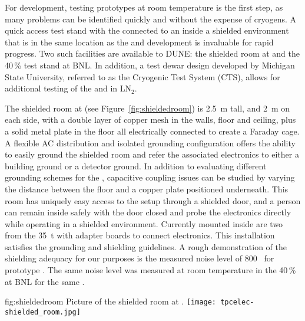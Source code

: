 For  development, testing prototypes at room temperature is the first step, as many problems can be identified quickly and without the expense of cryogens.  A quick access test stand with the  connected to an  inside a shielded environment that is in the same location as the  and  development is invaluable for rapid progress.  Two such facilities are available to DUNE: the shielded room at \fnal and the \num{40}\,\%  test stand at BNL.  In addition, a test dewar design developed by Michigan State University, referred to as the Cryogenic Test System (CTS), allows for additional testing of the  and  in LN$_2$.

The shielded room at \fnal (see Figure~\ref{fig:shieldedroom}) is \SI{2.5}{m} tall, and \SI{2}{m} on each side, with 
a double layer of copper mesh in the walls, floor and ceiling, plus a solid metal plate in the floor all electrically connected to create a Faraday cage.  A flexible AC distribution and isolated grounding configuration offers the ability to easily ground the shielded room and refer the associated electronics to either a building ground or a detector ground.  In addition
to evaluating different grounding schemes for the , capacitive coupling issues can be studied by varying the
distance between the floor and a copper plate positioned underneath.   
This room has uniquely easy access to the setup through a shielded door,
and a person can remain inside safely with the door closed and probe the electronics directly while operating
in a shielded environment.  Currently mounted inside are two  from the \SI{35}{t} 
with adapter boards to connect  electronics.  This installation satisfies the  grounding and shielding guidelines.  A rough demonstration of the shielding adequacy for our purposes  is the measured noise level of 800~ for  prototype .  The same noise level was measured at room temperature in the \num{40}\,\%  at BNL for the same .

\begin{dunefigure}
{fig:shieldedroom}
{Picture of the shielded room at \fnal.}
\texttt{[image: tpcelec-shielded\_room.jpg]}
\end{dunefigure}

